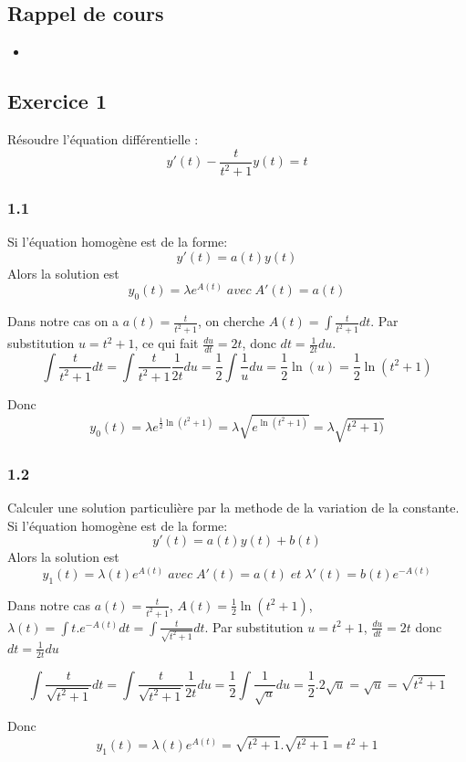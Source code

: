 \documentclass[]{book}
\theoremstyle{definition}
\begin{document}
\subsection*{Rappel de cours}

\begin{itemize}
\item 
\end{itemize}

\subsection*{Exercice 1}
R\'esoudre l'\'equation diff\'erentielle :
$$y'(t) - \frac{t}{t^2+1}y(t) = t$$

\subsubsection*{1.1}
Si l'\'equation homog\`ene est de la forme:
$$y'(t) = a(t)y(t)$$
Alors la solution est
$$y_0(t) = \lambda e^{A(t)}\; avec\; A'(t) = a(t)$$

Dans notre cas on a $a(t) = \frac{t}{t^2+1}$, on cherche $A(t) = \int{\frac{t}{t^2+1}dt}$.
Par substitution $u = t^2 +1$, ce qui fait $\frac{du}{dt} = 2t$, donc $dt = \frac{1}{2t}du$.
$$\int{\frac{t}{t^2+1}dt} = \int{\frac{t}{t^2+1}\frac{1}{2t}du} = \frac{1}{2}\int{\frac{1}{u}du} = \frac{1}{2}\ln(u) = \frac{1}{2}\ln(t^2+1)$$

Donc
$$y_0(t) = \lambda e^{\frac{1}{2}\ln(t^2+1)} = \lambda \sqrt{e^{\ln(t^2+1)}} = \lambda \sqrt{t^2+1)}$$

\subsubsection*{1.2}
Calculer une solution particuli\`ere par la methode de la variation de la constante.
Si l'\'equation homog\`ene est de la forme:
$$y'(t) = a(t)y(t) + b(t)$$
Alors la solution est
$$y_1(t) = \lambda(t) e^{A(t)}\; avec\; A'(t) = a(t)\; et\; \lambda'(t) = b(t)e^{-A(t)}$$

Dans notre cas $a(t) = \frac{t}{t^2+1}$, $A(t) = \frac{1}{2}\ln(t^2+1)$, $\lambda(t) = \int{t.e^{-A(t)}dt} = \int{\frac{t}{\sqrt{t^2+1}}dt}$.
Par substitution $u = t^2+1$, $\frac{du}{dt} = 2t$ donc $dt = \frac{1}{2t}du$

$$\int{\frac{t}{\sqrt{t^2+1}}dt} = \int{\frac{t}{\sqrt{t^2+1}}\frac{1}{2t}du} = \frac{1}{2}\int{\frac{1}{\sqrt{u}}du} = \frac{1}{2}.2\sqrt{u} = \sqrt{u} = \sqrt{t^2+1}$$

Donc
$$y_1(t) = \lambda(t) e^{A(t)} = \sqrt{t^2+1} . \sqrt{t^2+1} = t^2+1$$
\end{document}
